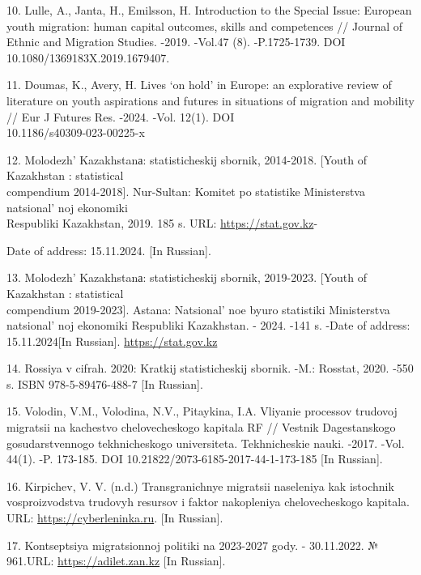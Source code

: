 \begin{references}
10. Lulle, A., Janta, H., Emilsson, H. Introduction to the Special
Issue: European youth migration: human capital outcomes, skills and
competences // Journal of Ethnic and Migration Studies. -2019. -Vol.47
(8). -P.1725-1739. DOI 10.1080/1369183X.2019.1679407.

11. Doumas, K., Avery, H. Lives `on hold' in Europe: an explorative
review of literature on youth aspirations and futures in situations of
migration and mobility // Eur J Futures Res. -2024. -Vol. 12(1). DOI\\
10.1186/s40309-023-00225-x

12. Molodezh'{} Kazakhstanа: statisticheskij sbornik,
2014-2018. {[}Youth of Kazakhstan : statistical \\compendium 2014-2018{]}.
Nur-Sultan: Komitet po statistike Ministerstva
natsional' noj ekonomiki \\Respubliki Kazakhstan, 2019. 185
s. URL: \href{https://stat.gov.kz/api/iblock/element/184021/file/ru/}{https://stat.gov.kz}-

Date of address: 15.11.2024. {[}In Russian{]}.

13. Molodezh'{} Kazakhstanа: statisticheskij sbornik,
2019-2023. {[}Youth of Kazakhstan : statistical \\compendium 2019-2023{]}.
Astana: Natsional' noe byuro statistiki Ministerstva
natsional' noj ekonomiki Respubliki Kazakhstan. - 2024.
-141 s. -Date of address: 15.11.2024{[}In Russian{]}.
\href{https://stat.gov.kz/api/iblock/element/184021/file/ru/}{https://stat.gov.kz}

14. Rossiya v cifrah. 2020: Kratkij statisticheskij sbornik. -M.:
Rosstat, 2020. -550 s. ISBN 978-5-89476-488-7 {[}In Russian{]}.

15. Volodin, V.M., Volodina, N.V., Pitaykina, I.A. Vliyanie processov
trudovoj migratsii na kachestvo chelovecheskogo kapitala RF // Vestnik
Dagestanskogo gosudarstvennogo tekhnicheskogo universiteta.
Tekhnicheskie nauki. -2017. -Vol. 44(1). -P. 173-185. DOI
10.21822/2073-6185-2017-44-1-173-185 {[}In Russian{]}.

16. Kirpichev, V. V. (n.d.) Transgranichnye migratsii naseleniya kak
istochnik vosproizvodstva trudovyh resursov i faktor nakopleniya
chelovecheskogo kapitala. URL:
\href{https://cyberleninka.ru/article/n/transgranichnye-migratsii-naseleniya-kak-istochnik-vosproizvodstva-trudovyh-resursov-i-faktor-nakopleniya-chelovecheskogo-kapitala}{https://cyberleninka.ru}.
{[}In Russian{]}.

17. Kontseptsiya migratsionnoj politiki na 2023-2027 gody. - 30.11.2022.
№ 961.URL: \href{https://adilet.zan.kz/rus/docs/P2200000961}{https://adilet.zan.kz} {[}In Russian{]}.
\end{references}

